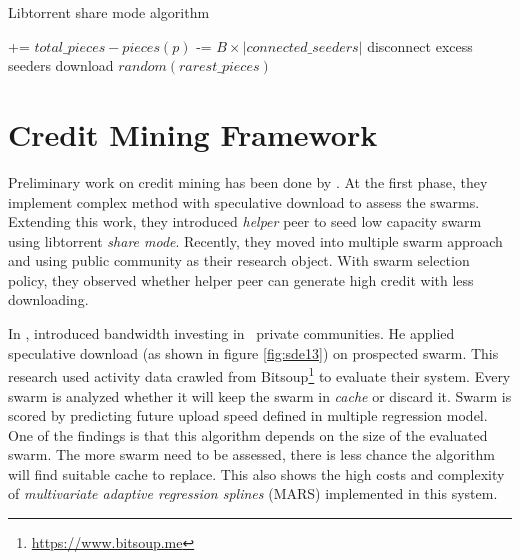 \begin{algorithm}
	\caption{Libtorrent share mode algorithm}
	\label{alg:ltsharemode}
	\begin{algorithmic}[1]
		\Statex
		 
				 += {$total\_pieces - pieces(p)$}
			\EndIf	
		\EndFor
		 -= {$B \times |connected\_seeders|$}		
			\State \Return
		\EndIf
			\State disconnect excess seeders
		\EndIf
			\State \Return
		\EndIf
			\State \Return
		\EndIf
			\State \Return
		\EndIf
		\State download {$random(rarest\_pieces)$}
	\end{algorithmic}
\end{algorithm}

\section{Credit Mining Framework}
\label{section:cmprior}
Preliminary work on credit mining has been done by \citeauthor{2015:creditmining:capota} \cite{2015:creditmining:capota, 2013:investmentcm:capota, 2014:bwmarket:capota}. At the first phase, they implement complex method with speculative download to assess the swarms\cite{2013:investmentcm:capota}. Extending this work, they introduced \textit{helper} peer to seed low capacity swarm using libtorrent \textit{share mode}\cite{2014:bwmarket:capota}. Recently, they moved into multiple swarm approach and using public community as their research object. With swarm selection policy, they observed whether helper peer can generate high credit with less downloading\cite{2015:creditmining:capota}.

In \citeyear{2013:investmentcm:capota}, \citeauthor{2013:investmentcm:capota} introduced bandwidth investing in \bt~private communities. He applied speculative download (as shown in figure \ref{fig:sde13}) on prospected swarm. This research used activity data crawled from Bitsoup\footnote{\url{https://www.bitsoup.me}} to evaluate their system. Every swarm is analyzed whether it will keep the swarm in \textit{cache} or discard it. Swarm is scored by predicting future upload speed defined in multiple regression model\cite{2013:investmentcm:capota}. One of the findings is that this algorithm depends on the size of the evaluated swarm. The more swarm need to be assessed, there is less chance the algorithm will find suitable cache to replace. This also shows the high costs and complexity of \textit{multivariate adaptive regression splines} (MARS) implemented in this system.

